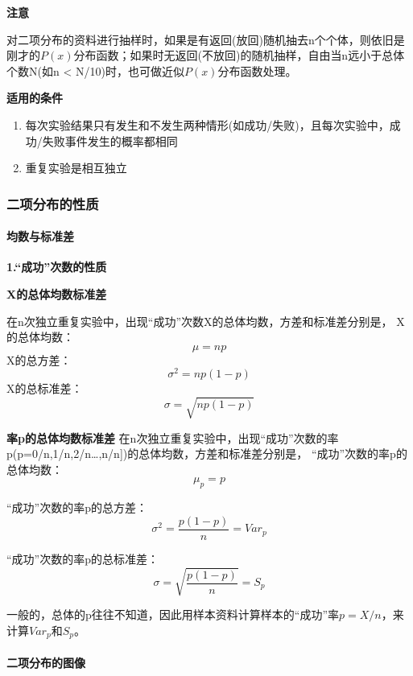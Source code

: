 \documentclass[
]{article}
\providecommand{\tightlist}{%
  \setlength{\itemsep}{0pt}\setlength{\parskip}{0pt}}
\begin{document}
\textbf{注意}

对二项分布的资料进行抽样时，如果是有返回(放回)随机抽去n个个体，则依旧是刚才的\(P(x)\)分布函数；如果时无返回(不放回)的随机抽样，自由当n远小于总体个数N(如n \textless{} N/10)时，也可做近似\(P(x)\)分布函数处理。

\textbf{适用的条件}

\begin{enumerate}
\def\labelenumi{\arabic{enumi}.}
\tightlist
\item
  每次实验结果只有发生和不发生两种情形(如成功/失败)，且每次实验中，成功/失败事件发生的概率都相同
\item
  重复实验是相互独立
\end{enumerate}

\hypertarget{ux4e8cux9879ux5206ux5e03ux7684ux6027ux8d28}{%
\subsubsection{二项分布的性质}\label{ux4e8cux9879ux5206ux5e03ux7684ux6027ux8d28}}

\hypertarget{ux5747ux6570ux4e0eux6807ux51c6ux5dee}{%
\paragraph{均数与标准差}\label{ux5747ux6570ux4e0eux6807ux51c6ux5dee}}

\textbf{1.``成功''次数的性质}

\textbf{X的总体均数标准差}

在n次独立重复实验中，出现``成功''次数X的总体均数，方差和标准差分别是，
X的总体均数：
\[μ=np\]
X的总方差：
\[σ^2=np(1-p)\]
X的总标准差：
\[σ=\sqrt{np(1-p)}\]

\textbf{率p的总体均数标准差}
在n次独立重复实验中，出现``成功''次数的率p(p=0/n,1/n,2/n\ldots,n/n{]})的总体均数，方差和标准差分别是，
``成功''次数的率p的总体均数：
\[μ_p=p\]

``成功''次数的率p的总方差：
\[σ^2=\frac{p(1-p)}{n}=Var_p\]

``成功''次数的率p的总标准差：
\[σ=\sqrt{\frac{p(1-p)}{n}}=S_p\]

一般的，总体的p往往不知道，因此用样本资料计算样本的``成功''率\(p=X/n\)，来计算\(Var_p和S_p\)。

\hypertarget{ux4e8cux9879ux5206ux5e03ux7684ux56feux50cf}{%
\paragraph{二项分布的图像}\label{ux4e8cux9879ux5206ux5e03ux7684ux56feux50cf}}
\end{document}
